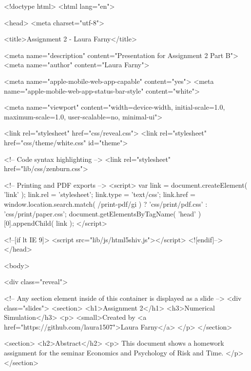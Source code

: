 <!doctype html>
<html lang="en">

	<head>
		<meta charset="utf-8">

		<title>Assignment 2 - Laura Farny</title>

		<meta name="description" content="Presentation for Assignment 2 Part B">
		<meta name="author" content="Laura Farny">

		<meta name="apple-mobile-web-app-capable" content="yes">
		<meta name="apple-mobile-web-app-status-bar-style" content="white">

		<meta name="viewport" content="width=device-width, initial-scale=1.0, maximum-scale=1.0, user-scalable=no, minimal-ui">

		<link rel="stylesheet" href="css/reveal.css">
		<link rel="stylesheet" href="css/theme/white.css" id="theme">

		<!-- Code syntax highlighting -->
		<link rel="stylesheet" href="lib/css/zenburn.css">

		<!-- Printing and PDF exports -->
		<script>
			var link = document.createElement( 'link' );
			link.rel = 'stylesheet';
			link.type = 'text/css';
			link.href = window.location.search.match( /print-pdf/gi ) ? 'css/print/pdf.css' : 'css/print/paper.css';
			document.getElementsByTagName( 'head' )[0].appendChild( link );
		</script>

		<!--[if lt IE 9]>
		<script src="lib/js/html5shiv.js"></script>
		<![endif]-->
	</head>

	<body>

		<div class="reveal">

			<!-- Any section element inside of this container is displayed as a slide -->
			<div class="slides">
				<section>
					<h1>Assignment 2</h1>
					<h3>Numerical Simulation</h3>
					<p>
						<small>Created by <a href="https://github.com/laura1507">Laura Farny</a>
					</p>
				</section>

				<section>
					<h2>Abstract</h2>
					<p>
						This document shows a homework assignment for the seminar Economics and Psychology of Risk and Time.
					</p>
				</section>

